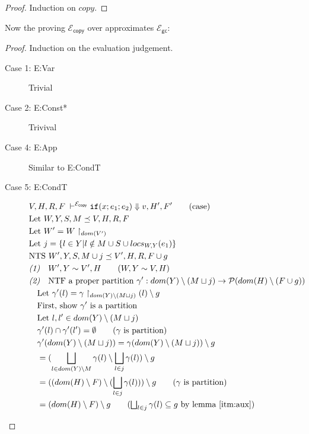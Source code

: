 \documentclass{easychair}
\newcommand{\ms}[1]{\ensuremath{\mathsf{#1}}}
\newcommand{\gcSem}{\ensuremath{\mathcal{E}_{\ms{gc}}}}
\newcommand{\copySem}{\ensuremath{\mathcal{E}_{\ms{copy}}}}
\theoremstyle{definition}
\begin{document}
\begin{proof}
	Induction on $copy$.
\end{proof}

Now the proving \copySem{} over approximates \gcSem{}:
\begin{proof}
Induction on the evaluation judgement.\\
\begin{description}
  \item[Case 1: E:Var] Trivial
  \item[Case 2: E:Const*] Trivival
  \item[Case 4: E:App] Similar to E:CondT
  \item[Case 5: E:CondT]
  \begin{align*}
		&V,H,R,F \; \vdash^{\copySem} \ifexabt{x}{e_1}{e_2} \Downarrow v, H',F' \tag{case}\\
		&\text{Let } W,Y,S,M \preceq V,H,R,F \\
		&\text{Let } W' = W \restriction_{dom(V')}\\
		&\text{Let } j = \{l \in Y | l \notin M \cup S \cup locs_{W,Y}(e_1) \}\\
		&\text{NTS } W',Y,S,M \cup j \preceq V',H,R,F \cup g\\
		&\emph{(1)}\quad W',Y \sim V',H \tag{$W,Y \sim V,H$}\\
		&\emph{(2)}\quad \text{NTF a proper partition }
		 \gamma' : dom(Y) \setminus (M \sqcup j) \to \mathcal{P}(dom(H)\setminus (F \cup g))  \\
		&\quad \text{Let } \gamma'(l) = \gamma \restriction_{dom(Y)\setminus(M \sqcup j)}(l) \setminus g\\
		&\quad \text{First, show $\gamma'$ is a partition}\\
		&\quad \text{Let } l, l' \in dom(Y) \setminus (M \sqcup j)\\
		&\quad \gamma'(l) \cap \gamma'(l') = \emptyset \tag{$\gamma$ is partition}\\
		&\quad \gamma'(dom(Y) \setminus (M \sqcup j)) = \gamma(dom(Y) \setminus (M \sqcup j)) \setminus g\\
		&\quad = (\bigsqcup_{l \in dom(Y) \setminus M} \gamma(l) \setminus \bigsqcup_{l \in j} \gamma(l)) 
			\setminus g\\
		&\quad = ((dom(H) \setminus F) \setminus (\bigsqcup_{l \in j} \gamma(l))) \setminus g 
			\tag{$\gamma$ is partition}\\
		&\quad = (dom(H) \setminus F) \setminus g 
			\tag{$\bigsqcup_{l \in j} \gamma(l) \subseteq g$ by lemma \ref{itm:aux}}\\

\end{align*}
\end{description}
\end{proof}
\end{document}
